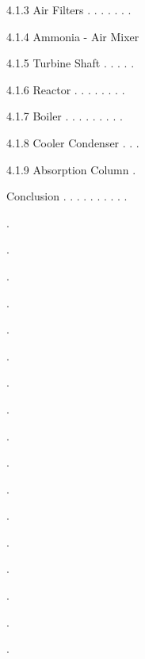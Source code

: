 \documentclass[a4paper,portrait,12pt]{article}
\begin{document}





\begin{flushleft}
4.1.3 Air Filters . . . . . . .
\end{flushleft}


\begin{flushleft}
4.1.4 Ammonia - Air Mixer
\end{flushleft}


\begin{flushleft}
4.1.5 Turbine Shaft . . . . .
\end{flushleft}


\begin{flushleft}
4.1.6 Reactor . . . . . . . .
\end{flushleft}


\begin{flushleft}
4.1.7 Boiler . . . . . . . . .
\end{flushleft}


\begin{flushleft}
4.1.8 Cooler Condenser . . .
\end{flushleft}


\begin{flushleft}
4.1.9 Absorption Column .
\end{flushleft}


\begin{flushleft}
Conclusion . . . . . . . . . .
\end{flushleft}





.


.


.


.


.


.


.


.





.


.


.


.


.


.


.


.





.
\end{document}
